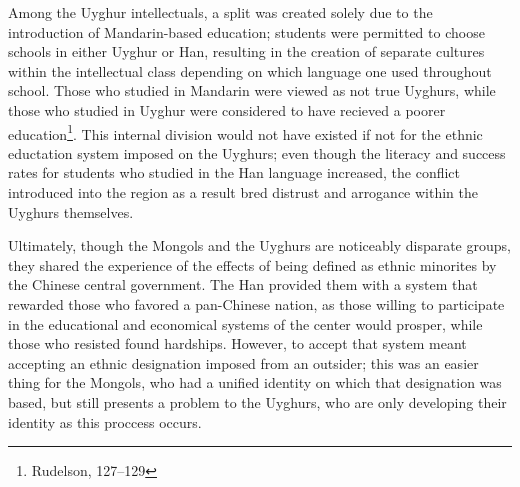 Among the Uyghur intellectuals, a split was created solely due to the
introduction of Mandarin-based education; students were permitted to choose
schools in either Uyghur or Han, resulting in the creation of separate cultures
within the intellectual class depending on which language one used throughout
school. Those who studied in Mandarin were viewed as not true Uyghurs, while
those who studied in Uyghur were considered to have recieved a poorer
education\footnote{Rudelson, 127--129}. This internal division would not have
existed if not for the ethnic eductation system imposed on the Uyghurs; even
though the literacy and success rates for students who studied in the Han
language increased, the conflict introduced into the region as a result bred
distrust and arrogance within the Uyghurs themselves.

Ultimately, though the Mongols and the Uyghurs are noticeably disparate groups,
they shared the experience of the effects of being defined as ethnic minorites
by the Chinese central government. The Han provided them with a system that
rewarded those who favored a pan-Chinese nation, as those willing to participate
in the educational and economical systems of the center would prosper, while
those who resisted found hardships. However, to accept that system meant
accepting an ethnic designation imposed from an outsider; this was an easier
thing for the Mongols, who had a unified identity on which that designation was
based, but still presents a problem to the Uyghurs, who are only developing
their identity as this proccess occurs.
